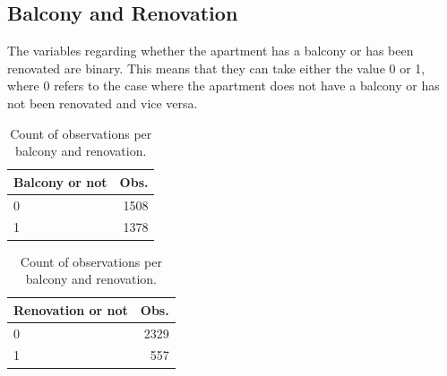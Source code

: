 \subsection*{Balcony and Renovation}
The variables regarding whether the apartment has a balcony or has been renovated are binary.
This means that they can take either the value 0 or 1, where 0 refers to the case where the apartment does not have a balcony or has not been renovated and vice versa.
\begin{table}[H]
    \centering
    \begin{tabular}{lr}
        \toprule
        \textbf{Balcony or not} & \textbf{Obs.}\\
        \midrule
        0 & 1508\\
        1 & 1378\\
        \bottomrule
    \end{tabular}
    \hspace{20pt}
    \begin{tabular}{lr}
        \toprule
        \textbf{Renovation or not} & \textbf{Obs.}\\
        \midrule
        0 & 2329\\
        1 & 557\\
        \bottomrule
    \end{tabular}
    \caption{Count of observations per balcony and renovation.}
\end{table}

%

